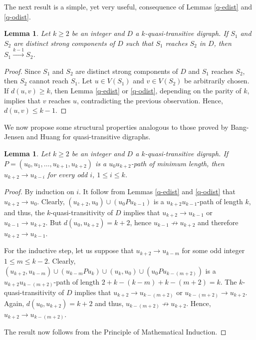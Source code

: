 \documentclass[preprint]{elsarticle}
\newtheorem{lem}[thm]{Lemma}
\begin{document}
The next result is a simple, yet very useful, consequence of Lemmas \ref{q-edist} and \ref{q-odist}.

\begin{lem} \label{k-1-dom-comp}
Let $k \ge 2$ be an integer and $D$ a $k$-quasi-transitive digraph.   If $S_1$ and $S_2$ are distinct strong components of $D$ such that $S_1$ reaches $S_2$ in $D$, then $S_1 \stackrel{k-1}{\to} S_2$.
\end{lem}

\begin{proof}
Since $S_1$ and $S_2$ are distinct strong components of $D$ and $S_1$ reaches $S_2$, then $S_2$ cannot reach $S_1$.  Let $u \in V(S_1)$ and $v \in V(S_2)$ be arbitrarily chosen.   If $d(u,v) \ge k$, then Lemma \ref{q-edist} or \ref{q-odist}, depending on the parity of $k$, implies that $v$ reaches $u$, contradicting the previous observation.   Hence, $d(u,v) \le k-1$.
\end{proof}



We now propose some structural properties analogous to those proved by Bang-Jensen and Huang for quasi-transitive digraphs.



\begin{lem} \label{k+2-odd}
Let $k \ge 2$ be an integer and $D$ a $k$-quasi-transitive digraph.   If $P = (u_0, u_1, \dots, u_{k+1}, u_{k+2})$ is a $u_0 u_{k+2}$-path of minimum length, then $u_{k+2} \to u_{k-i}$ for every odd $i$, $1 \le i \le k$.
\end{lem}

\begin{proof}
By induction on $i$.  It follow from Lemmas \ref{q-edist} and \ref{q-odist} that $u_{k+2} \to u_0$.   Clearly, $(u_{k+2}, u_0) \cup (u_0 P u_{k-1})$ is a $u_{k+2} u_{k-1}$-path of length $k$, and thus, the $k$-quasi-transitivity of $D$ implies that $u_{k+2} \to u_{k-1}$ or $u_{k-1} \to u_{k+2}$.   But $d (u_0, u_{k+2}) = k+2$, hence $u_{k-1} \not \to u_{k+2}$ and therefore $u_{k+2} \to u_{k-1}$.

For the inductive step, let us suppose that $u_{k+2} \to u_{k-m}$ for some odd integer $1 \le m \le k-2$.   Clearly, $(u_{k+2}, u_{k-m}) \cup (u_{k-m} P u_k) \cup (u_k, u_0) \cup (u_0 P u_{k-(m+2)})$ is a $u_{k+2} u_{k-(m+2)}$-path of length $2 + k -(k-m) + k-(m+2) = k$.   The $k$-quasi-transitivity of $D$ implies that $u_{k+2} \to u_{k-(m+2)}$ or $u_{k-(m+2)} \to u_{k+2}$.   Again, $d(u_0, u_{k+2}) = k+2$ and thus, $u_{k-(m+2)} \not \to u_{k+2}$.   Hence, $u_{k+2} \to u_{k-(m+2)}$.

The result now follows from the Principle of Mathematical Induction.
\end{proof}
\end{document}
